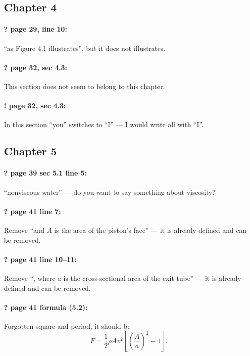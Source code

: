 \documentclass[twoside]{article}
\begin{document}
\subsection*{Chapter 4}

\paragraph{? page 29, line 10:} ``as Figure 4.1 illustrates'', but it does not illustrates.

\paragraph{? page 32, sec 4.3:} This section does not seem to belong to this chapter.

\paragraph{! page 32, sec 4.3:} In this section ``you'' switches to ``I'' --- I would write all with ``I''.

\subsection*{Chapter 5}

\paragraph{? page 39 sec 5.1 line 5:} ``nonviscous water'' --- do you want to say something about viscosity?

\paragraph{? page 41 line 7:} Remove ``and $A$ is the area of the piston’s face'' --- it is already defined and can be removed.

\paragraph{? page 41 line 10--11:} Remove ``, where $a$ is the cross-sectional area of the exit tube'' --- it is already defined and can be removed.

\paragraph{? page 41 formula (5.2):} Forgotten square and period, it should be
\[F = \frac12\rho A v^{2} \left[ \left(\frac{A}{a}\right)^2  - 1 \right].\]
\end{document}
